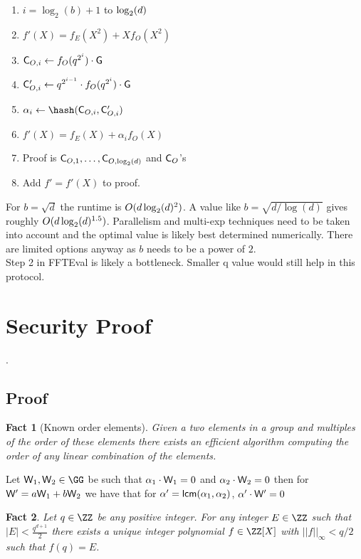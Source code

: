 \documentclass[10pt,conference]{IEEEtran}
\theoremstyle{Definition}
\newtheorem{fact}{Fact}
\begin{document}
\begin{mdframed}
\begin{enumerate}[nolistsep]
		\item \pcfor $i=\log_2(b)+1$ to $\log_2(d)$
		\item \pcind[1] $f'(X)=f_E(X^2)+Xf_O(X^2)$
		\item \pcind[1] $\mathsf{C}_{O,i}\gets f_O(q^{2^i}) \cdot \mathsf{G}$ 
		\item  \pcind[1] $\mathsf{C}_{O,i}'\gets q^{2^{i-1}} \cdot f_O(q^{2^i}) \cdot \mathsf{G}$ 
		\item \pcind[1] $\alpha_i\gets\hash(\gr{C}_{O,i},\gr{C}_{O,i}')$
		\item \pcind[1] $f'(X)=f_E(X)+\alpha_i f_O(X)$
		\item Proof is $\mathsf{C}_{O,1},\dots,\mathsf{C}_{O,\log_2(d)}$ and $\mathsf{C}_O$'s
		\item Add $f'=f'(X)$ to proof.
	\end{enumerate}
	\end{mdframed}
	For $b=\sqrt{d}$ the runtime is $O(d \log_2(d)^2)$. A value like $b=\sqrt{d/\log(d)}$ gives roughly $O(d\log_2(d)^{1.5})$. Parallelism and multi-exp techniques need to be taken into account and the optimal value is likely best determined numerically. There are limited options anyway as $b$ needs to be a power of $2$.\\ 
Step 2 in FFTEval is likely a bottleneck. Smaller q value would still help in this protocol.
\section{Security Proof}

.

\subsection{Proof}

\begin{fact}[Known order elements]
	\label{fact:knownorder}
	Given a two elements in a group and multiples of the order of these elements there exists an efficient algorithm computing the order of any linear combination of the elements.
\end{fact}
Let $\gr{W}_1,\gr{W}_2 \in \GG$ be such that $\alpha_1 \cdot \mathsf{W}_1=0$ and $\alpha_2 \cdot \mathsf{W}_2=0$ then for $\mathsf{W}'=a\mathsf{W}_1 + b \mathsf{W}_2$ we have that for $\alpha'=\mathsf{lcm}(\alpha_1,\alpha_2)$, $\alpha' \cdot \mathsf{W}'=0$
\begin{fact}
\label{fact:encoding}
Let $q \in \ZZ$ be any positive integer. For any integer $E \in \ZZ$ such that $|E|<\frac{q^{d+1}}{2}$ there exists a unique integer polynomial $f \in \ZZ[X]$ with $||f||_\infty < q/2$ such that $f(q) = E$. 
\end{fact} 
\end{document}
